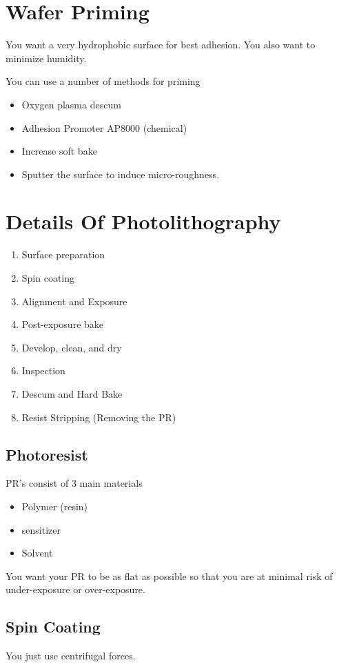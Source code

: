 \documentclass[fleqn]{report}
\begin{document}
\section{Wafer Priming}
You want a very hydrophobic surface for best adhesion. You also 
want to minimize humidity. 

You can use a number of methods for priming 
\begin{itemize}
    \item 
    Oxygen plasma descum 
    \item 
    Adhesion Promoter AP8000 (chemical)
    \item 
    Increase soft bake 
    \item 
    Sputter the surface to induce micro-roughness. 
\end{itemize}

\section{Details Of Photolithography}
\begin{enumerate}
    \item 
    Surface preparation 
    \item 
    Spin coating 
    \item 
    Alignment and Exposure 
    \item 
    Post-exposure bake 
    \item 
    Develop, clean, and dry 
    \item 
    Inspection 
    \item 
    Descum and Hard Bake 
    \item 
    Resist Stripping (Removing the PR)
\end{enumerate}

\subsection{Photoresist}
PR's consist of 3 main materials 

\begin{itemize}
    \item 
    Polymer (resin)
    \item 
    sensitizer 
    \item 
    Solvent 
\end{itemize}

You want your PR to be as flat as possible so that you are 
at minimal risk of under-exposure or over-exposure.

\subsection{Spin Coating}
You just use centrifugal forces. 
\end{document}
